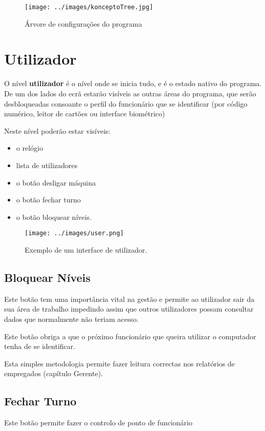 \documentclass[a4paper,11pt,openany]{memoir}
\begin{document}
\begin{figure}
\texttt{[image: ../images/konceptoTree.jpg]}
\caption[Submanifold]{Árvore de configurações do programa}
\end{figure}




\chapter{Utilizador} 

O nível \textbf{utilizador} é o nível onde se inicia tudo, e é o estado nativo do programa.
De um dos lados do ecrã estarão visíveis as outras áreas do programa, que serão desbloqueadas 
consoante o perfil do funcionário que se identificar (por código numérico, leitor de cartões ou interface biométrico)

Neste nível poderão estar visíveis:
\begin{itemize}
\item o relógio
\item lista de utilizadores
\item o botão desligar máquina
\item o botão fechar turno
\item o botão bloquear níveis.
\end{itemize}
\begin{figure}
\texttt{[image: ../images/user.png]}
\caption[Submanifold]{Exemplo de um interface de utilizador.}
\end{figure}

\section{Bloquear Níveis}

Este botão tem uma importância vital na gestão e permite ao utilizador sair da sua área de trabalho
impedindo assim que outros utilizadores possam consultar dados que normalmente não teriam acesso.

Este botão obriga a que o próximo funcionário que queira utilizar o computador tenha de se identificar.

Esta simples metodologia permite fazer leitura correctas nos relatórios de empregados (capítulo Gerente).

\section{Fechar Turno}

Este botão permite fazer o controlo de ponto de funcionário
\end{document}
